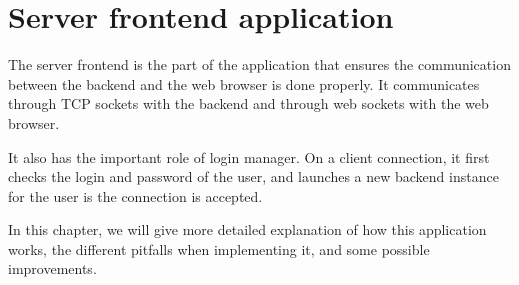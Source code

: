 \chapter{Server frontend application}
%
The server frontend is the part of the application that ensures 
the communication between the backend and the web browser is done 
properly. It communicates through TCP sockets with the backend
and through web sockets with the web browser.

It also has the important role of login manager. On a client connection, 
it first checks the login and password of the user, and launches a new 
backend instance for the user is the connection is accepted.

In this chapter, we will give more detailed explanation of how this 
application works, the different pitfalls when implementing it, and 
some possible improvements.
%
